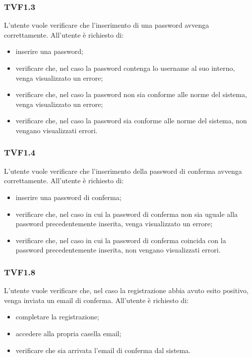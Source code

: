 		\subsubsection{TVF1.3}
			L'utente vuole verificare che l'inserimento di una password avvenga correttamente. All'utente è richiesto di:
			\begin{itemize}
				\item inserire una password;
				\item verificare che, nel caso la password contenga lo username al suo interno, venga visualizzato un errore;
				\item verificare che, nel caso la password non sia conforme alle norme del sistema, venga visualizzato un errore;
				\item verificare che, nel caso la password sia conforme alle norme del sistema, non vengano visualizzati errori.
			\end{itemize}
			
		\subsubsection{TVF1.4}
			L'utente vuole verificare che l'inserimento della password di conferma avvenga correttamente. All'utente è richiesto di:
			\begin{itemize}
				\item inserire una password di conferma;
				\item verificare che, nel caso in cui la password di conferma non sia uguale alla password precedentemente inserita, venga visualizzato un errore;
				\item verificare che, nel caso in cui la password di conferma coincida con la password precedentemente inserita, non vengano visualizzati errori.
			\end{itemize}
			
		\subsubsection{TVF1.8}
			L'utente vuole verificare che, nel caso la registrazione abbia avuto esito positivo, venga inviata un email di conferma. All'utente è richiesto di:
			\begin{itemize}
				\item completare la registrazione;
				\item accedere alla propria casella email;
				\item verificare che sia arrivata l'email di conferma dal sistema.
			\end{itemize}
			

